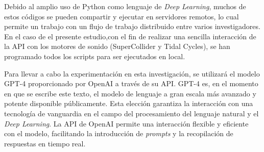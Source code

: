 Debido al amplio uso de Python como lenguaje de \emph{Deep Learning}, muchos de estos códigos se pueden compartir y ejecutar en servidores remotos, lo cual permite un trabajo con un flujo de trabajo distribuido entre varios investigadores. En el caso de el presente estudio,con el fin de realizar una sencilla interacción de la API con los motores de sonido (SuperCollider y Tidal Cycles), se han programado todos los scripts para ser ejecutados en local.









Para llevar a cabo la experimentación en esta investigación, se utilizará el modelo GPT-4 proporcionado por OpenAI a través de su API. GPT-4 es, en el momento en que se escribe este texto, el modelo de lenguaje a gran escala más avanzado y potente disponible públicamente. Esta elección garantiza la interacción con una tecnología de vanguardia en el campo del procesamiento del lenguaje natural y el \emph{Deep Learning}. La API de OpenAI permite una interacción flexible y eficiente con el modelo, facilitando la introducción de \emph{prompts} y la recopilación de respuestas en tiempo real.